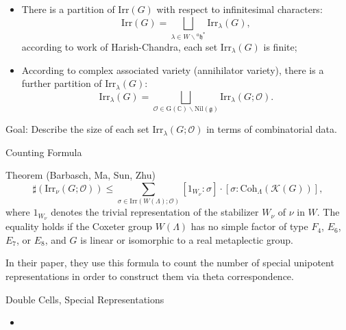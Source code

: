 \documentclass{beamer}
\newcommand{\BC}{{\mathbb {C}}}
\newcommand{\CK}{{\mathcal {K}}}
\newcommand{\CO}{{\mathcal {O}}}
\newcommand{\RG}{{\mathrm {G}}}
\newcommand{\fg}{\mathfrak{g}}
\newcommand{\fh}{\mathfrak{h}}
\newcommand{\Irr}{{\mathrm{Irr}}}
\newcommand{\Nil}{{\mathrm{Nil}}}
\begin{document}
\begin{frame}

  \begin{itemize}
    \item There is a partition of $\Irr(G)$ with respect to infinitesimal characters:
  \[\Irr(G) = \bigsqcup_{\lambda \in W \backslash {^{a}\fh}^*} \Irr_{\lambda}(G),
  \]
  according to work of Harish-Chandra, each set $\Irr_{\lambda}(G)$ is finite;
  \item According to complex associated variety (annihilator variety), there is a further partition of $\Irr_{\lambda}(G)$:
  \[\Irr_{\lambda}(G) = \bigsqcup_{\CO \in \RG(\BC)\backslash \Nil(\fg)}\Irr_{\lambda}(G;\CO).\]
  \end{itemize}

Goal: Describe the size of each set $\Irr_{\lambda}(G;\CO)$ in terms of combinatorial data.
\end{frame}






\begin{frame}{Counting Formula}
\begin{block}{Theorem (Barbasch, Ma, Sun, Zhu)}
  \begin{equation*}
        \sharp(\Irr_{\nu}(G;\CO)) \leq \sum_{\sigma \in \Irr(W(\Lambda);\CO)} [1_{W_\nu}:\sigma] \cdot [\sigma:\mathrm{Coh}_{\Lambda}(\CK(G))],
    \end{equation*}
    where $1_{W_\nu}$ denotes the trivial representation of the stabilizer $W_\nu$ of $\nu$ in $W$. The equality holds if the Coxeter group $W(\Lambda)$ has no simple factor of type $F_4$, $E_6$, $E_7$, or $E_8$, and $G$ is linear or isomorphic to a real metaplectic group.
\end{block}

In their paper, they use this formula to count the number of special unipotent representations in order to construct them via theta correspondence.

\end{frame}





\begin{frame}{Double Cells, Special Representations}
  \begin{itemize}
    \item 
  \end{itemize}
\end{frame}
\end{document}

